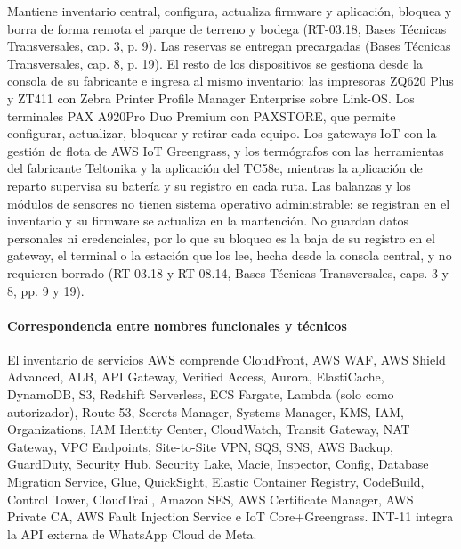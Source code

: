 Mantiene inventario central, configura, actualiza firmware y aplicación, bloquea y borra de forma remota el parque de terreno y bodega (RT-03.18, Bases Técnicas Transversales, cap. 3, p. 9). Las reservas se entregan precargadas (Bases Técnicas Transversales, cap. 8, p. 19). El resto de los dispositivos se gestiona desde la consola de su fabricante e ingresa al mismo inventario: las impresoras ZQ620 Plus y ZT411 con Zebra Printer Profile Manager Enterprise sobre Link-OS. Los terminales PAX A920Pro Duo Premium con PAXSTORE, que permite configurar, actualizar, bloquear y retirar cada equipo. Los gateways IoT con la gestión de flota de AWS IoT Greengrass, y los termógrafos con las herramientas del fabricante Teltonika y la aplicación del TC58e, mientras la aplicación de reparto supervisa su batería y su registro en cada ruta. Las balanzas y los módulos de sensores no tienen sistema operativo administrable: se registran en el inventario y su firmware se actualiza en la mantención. No guardan datos personales ni credenciales, por lo que su bloqueo es la baja de su registro en el gateway, el terminal o la estación que los lee, hecha desde la consola central, y no requieren borrado (RT-03.18 y RT-08.14, Bases Técnicas Transversales, caps. 3 y 8, pp. 9 y 19).

\paragraph{Correspondencia entre nombres funcionales y técnicos}
El inventario de servicios AWS comprende CloudFront, AWS WAF, AWS Shield Advanced, ALB, API Gateway, Verified Access, Aurora, ElastiCache, DynamoDB, S3, Redshift Serverless, ECS Fargate, Lambda (solo como autorizador), Route 53, Secrets Manager, Systems Manager, KMS, IAM, Organizations, IAM Identity Center, CloudWatch, Transit Gateway, NAT Gateway, VPC Endpoints, Site-to-Site VPN, SQS, SNS, AWS Backup, GuardDuty, Security Hub, Security Lake, Macie, Inspector, Config, Database Migration Service, Glue, QuickSight, Elastic Container Registry, CodeBuild, Control Tower, CloudTrail, Amazon SES, AWS Certificate Manager, AWS Private CA, AWS Fault Injection Service e IoT Core+Greengrass. INT-11 integra la API externa de WhatsApp Cloud de Meta.

